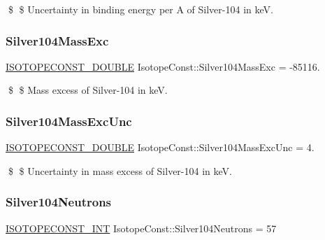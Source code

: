 \$ \$ Uncertainty in binding energy per A of Silver-\/104 in keV. \mbox{\label{group___isotope_const-_silver-_ag104_ga41ee942c14dc8e51bc19f09256ed9ff1}} 
\subsubsection{\texorpdfstring{Silver104\+Mass\+Exc}{Silver104MassExc}}
{\footnotesize\ttfamily \mbox{\hyperlink{group___isotope_const-_macros_ga8f45a7272ce02c0b4c65c44636ed719a}{I\+S\+O\+T\+O\+P\+E\+C\+O\+N\+S\+T\+\_\+\+D\+O\+U\+B\+LE}} Isotope\+Const\+::\+Silver104\+Mass\+Exc = -\/85116.}

\$ \$ Mass excess of Silver-\/104 in keV. \mbox{\label{group___isotope_const-_silver-_ag104_gaeb32beedc56216f10b27ce401b03c872}} 
\subsubsection{\texorpdfstring{Silver104\+Mass\+Exc\+Unc}{Silver104MassExcUnc}}
{\footnotesize\ttfamily \mbox{\hyperlink{group___isotope_const-_macros_ga8f45a7272ce02c0b4c65c44636ed719a}{I\+S\+O\+T\+O\+P\+E\+C\+O\+N\+S\+T\+\_\+\+D\+O\+U\+B\+LE}} Isotope\+Const\+::\+Silver104\+Mass\+Exc\+Unc = 4.}

\$ \$ Uncertainty in mass excess of Silver-\/104 in keV. \mbox{\label{group___isotope_const-_silver-_ag104_ga938df038de76975f2063d0b50f36ee7e}} 
\subsubsection{\texorpdfstring{Silver104\+Neutrons}{Silver104Neutrons}}
{\footnotesize\ttfamily \mbox{\hyperlink{group___isotope_const-_macros_ga5f18360b3e99483a35c32d789e62621c}{I\+S\+O\+T\+O\+P\+E\+C\+O\+N\+S\+T\+\_\+\+I\+NT}} Isotope\+Const\+::\+Silver104\+Neutrons = 57}

